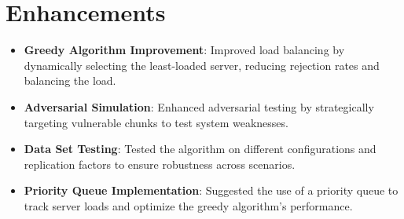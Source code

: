 \documentclass{article}
\begin{document}
\section*{Enhancements}
\begin{itemize}
    \item \textbf{Greedy Algorithm Improvement}: Improved load balancing by dynamically selecting the least-loaded server, reducing rejection rates and balancing the load.
    \item \textbf{Adversarial Simulation}: Enhanced adversarial testing by strategically targeting vulnerable chunks to test system weaknesses.
    \item \textbf{Data Set Testing}: Tested the algorithm on different configurations and replication factors to ensure robustness across scenarios.
    \item \textbf{Priority Queue Implementation}: Suggested the use of a priority queue to track server loads and optimize the greedy algorithm's performance.
\end{itemize}
\end{document}
